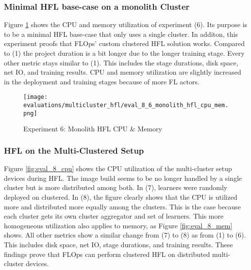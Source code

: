 \pagebreak

\subsubsection{Minimal HFL base-case on a monolith Cluster}

Figure \ref{fig:eval_6_cpu_mem} shows the CPU and memory utilization of experiment (6).
Its purpose is to be a minimal HFL base-case that only uses a single cluster.
In additon, this experiment proofs that FLOps' custom clustered HFL solution works.
Compared to (1) the project duration is a bit longer due to the longer training stage.
Every other metric stays similar to (1).
This includes the stage durations, disk space, net IO, and training results.
CPU and memory utilization are slightly increased in the deployment and training stages because of more FL actors.

\begin{figure}[H]
    \begin{adjustwidth}{-0.2\paperwidth}{-0.2\paperwidth}
        \centering
        \texttt{[image: evaluations/multicluster\_hfl/eval\_8\_6\_monolith\_hfl\_cpu\_mem.png]}
        \caption{Experiment 6: Monolith HFL CPU \& Memory}
        \label{fig:eval_6_cpu_mem}
    \end{adjustwidth}
\end{figure}

\subsubsection{HFL on the Multi-Clustered Setup}

Figure \ref{fig:eval_8_cpu} shows the CPU utilization of the multi-cluster setup devices during HFL.
The image build seems to be no longer handled by a single cluster but is more distributed among both.
In (7), learners were randomly deployed on clustered.
In (8), the figure clearly shows that the CPU is utilized more and distributed more equally among the clusters.
This is the case because each cluster gets its own cluster aggregator and set of learners.
This more homogeneous utilization also applies to memory, as Figure \ref{fig:eval_8_mem} shows.
All other metrics show a similar change from (7) to (8) as from (1) to (6).
This includes disk space, net IO, stage durations, and training results.
These findings prove that FLOps can perform clustered HFL on distributed multi-cluster devices.


